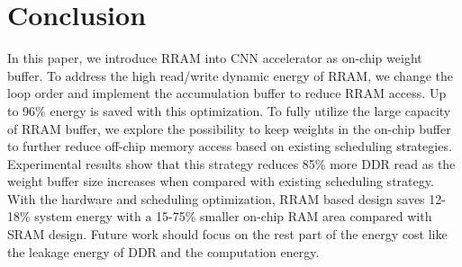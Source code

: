 \section{Conclusion}\label{sec:conclusion}

In this paper, we introduce RRAM into CNN accelerator as on-chip weight buffer. To address the high read/write dynamic energy of RRAM, we change the loop order and implement the accumulation buffer to reduce RRAM access. Up to 96\% energy is saved with this optimization. To fully utilize the large capacity of RRAM buffer, we explore the possibility to keep weights in the on-chip buffer to further reduce off-chip memory access based on existing scheduling strategies. Experimental results show that this strategy reduces 85\% more DDR read as the weight buffer size increases when compared with existing scheduling strategy. With the hardware and scheduling optimization, RRAM based design saves 12-18\% system energy with a 15-75\% smaller on-chip RAM area compared with SRAM design. Future work should focus on the rest part of the energy cost like the leakage energy of DDR and the computation energy.